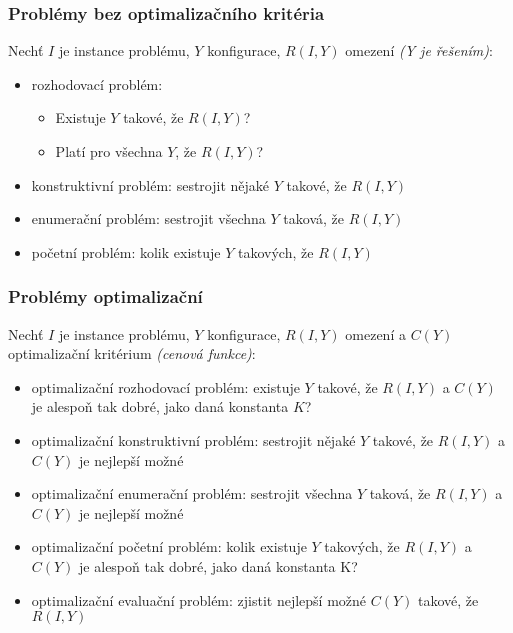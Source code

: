 \subsubsection*{Problémy bez optimalizačního kritéria}

Nechť $I$ je instance problému, $Y$ konfigurace, $R(I, Y)$ omezení \textit{(Y je řešením)}:

\begin{itemize}
    \item rozhodovací problém: 
    \begin{itemize}
        \item Existuje $Y$ takové, že $R(I, Y)$?
        \item Platí pro všechna $Y$, že $R(I, Y)$?
    \end{itemize}
    \item konstruktivní problém: sestrojit nějaké $Y$ takové, že $R(I, Y)$
    \item enumerační problém: sestrojit všechna $Y$ taková, že $R(I, Y)$
    \item početní problém: kolik existuje $Y$ takových, že $R(I, Y)$
\end{itemize}

\subsubsection*{Problémy optimalizační}

Nechť $I$ je instance problému, $Y$ konfigurace, $R(I, Y)$ omezení a $C(Y)$ optimalizační kritérium \textit{(cenová funkce)}:

\begin{itemize}
    \item optimalizační rozhodovací problém: existuje $Y$ takové, že $R(I, Y)$ a $C(Y)$ je alespoň tak dobré, jako daná konstanta $K$?
    \item optimalizační konstruktivní problém: sestrojit nějaké $Y$ takové, že $R(I, Y)$ a $C(Y)$ je nejlepší možné
    \item optimalizační enumerační problém: sestrojit všechna $Y$ taková, že $R(I, Y)$ a $C(Y)$ je nejlepší možné
    \item optimalizační početní problém: kolik existuje $Y$ takových, že $R(I, Y)$ a $C(Y)$ je alespoň tak dobré, jako daná konstanta K?
    \item optimalizační evaluační problém: zjistit nejlepší možné $C(Y)$ takové, že $R(I, Y)$
\end{itemize}

